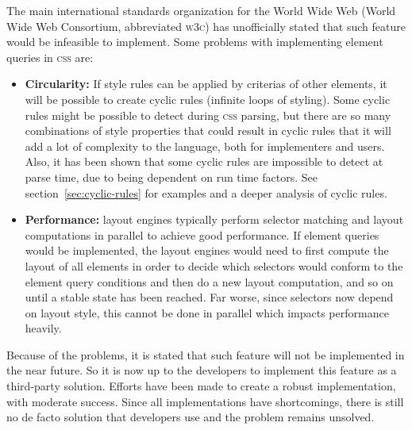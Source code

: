 \documentclass[a4paper,11pt]{kth-mag}
\begin{document}
      The main international standards organization for the World Wide Web (World Wide Web Consortium, abbreviated \textsc{w3c}) has unofficially stated that such feature would be infeasible to implement.
      Some problems with implementing element queries in \textsc{css} are:
      \begin{itemize}
        \item \textbf{Circularity:}
        If style rules can be applied by criterias of other elements, it will be possible to create cyclic rules (infinite loops of styling).
        Some cyclic rules might be possible to detect during \textsc{css} parsing, but there are so many combinations of style properties that could result in cyclic rules that it will add a lot of complexity to the language, both for implementers and users.
        Also, it has been shown that some cyclic rules are impossible to detect at parse time, due to being dependent on run time factors.
        See section~\ref{sec:cyclic-rules} for examples and a deeper analysis of cyclic rules.
        \item \textbf{Performance:} 
        layout engines typically perform selector matching and layout computations in parallel to achieve good performance.
        If element queries would be implemented, the layout engines would need to first compute the layout of all elements in order to decide which selectors would conform to the element query conditions and then do a new layout computation, and so on until a stable state has been reached.
        Far worse, since selectors now depend on layout style, this cannot be done in parallel which impacts performance heavily.
      \end{itemize}
      Because of the problems, it is stated that such feature will not be implemented in the near future. So it is now up to the developers to implement this feature as a third-party solution.
      Efforts have been made to create a robust implementation, with moderate success.
      Since all implementations have shortcomings, there is still no de facto solution that developers use and the problem remains unsolved.
\end{document}
